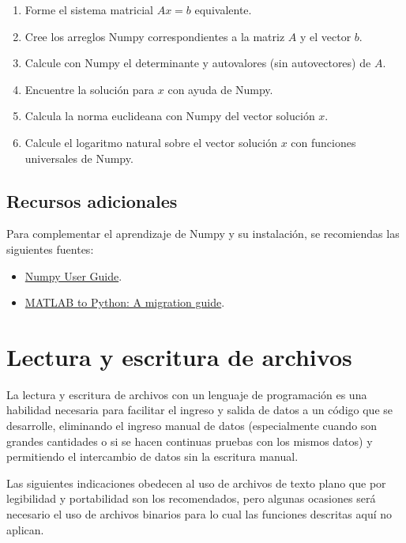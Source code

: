 \begin{enumerate}
\def\labelenumi{\arabic{enumi}.}

\item
  Forme el sistema matricial \(Ax=b\) equivalente.
\item
  Cree los arreglos Numpy correspondientes a la matriz \(A\) y el vector
  \(b\).
\item
  Calcule con Numpy el determinante y autovalores (sin autovectores) de
  \(A\).
\item
  Encuentre la solución para \(x\) con ayuda de Numpy.
\item
  Calcula la norma euclideana con Numpy del vector solución \(x\).
\item
  Calcule el logaritmo natural sobre el vector solución \(x\) con
  funciones universales de Numpy.
\end{enumerate}


\subsection{Recursos adicionales}

Para complementar el aprendizaje de Numpy y su instalación, se
recomiendas las siguientes fuentes:

\begin{itemize}
\item
  \href{https://docs.scipy.org/doc/numpy/user/}{Numpy User Guide}.
\item
  \href{https://www.enthought.com/wp-content/uploads/Enthought-MATLAB-to-Python-White-Paper.pdf}{MATLAB
  to Python: A migration guide}.
\end{itemize}


\section{Lectura y escritura de archivos}

La lectura y escritura de archivos con un lenguaje de programación es una habilidad necesaria para facilitar el ingreso y salida de datos a un código
que se desarrolle, eliminando el ingreso manual de datos (especialmente cuando son grandes cantidades o si se hacen continuas pruebas con los mismos datos)
y permitiendo el intercambio de datos sin la escritura manual.

Las siguientes indicaciones obedecen al uso de archivos de texto plano que por legibilidad y portabilidad son los recomendados, pero algunas ocasiones será
necesario el uso de archivos binarios para lo cual las funciones descritas aquí no aplican.

